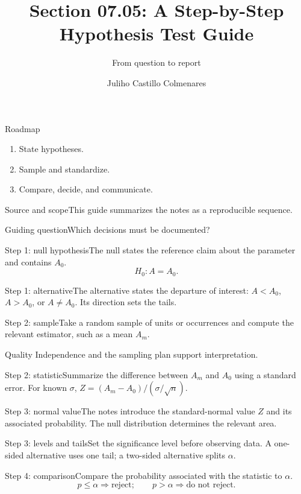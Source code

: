 \documentclass[10pt,aspectratio=169]{beamer}
\title[Hypothesis testing guide]{Section 07.05: A Step-by-Step Hypothesis Test Guide}\subtitle{From question to report}
\author[J. Castillo Colmenares]{Juliho Castillo Colmenares}\institute{Tecnológico de Monterrey}\date{}
\begin{document}
\begin{frame}[plain]\titlepage\end{frame}
\begin{frame}{Roadmap}\small\begin{enumerate}\item State hypotheses.\item Sample and standardize.\item Compare, decide, and communicate.\end{enumerate}\end{frame}
\begin{frame}{Source and scope}\small This guide summarizes the notes as a reproducible sequence.\begin{block}{Guiding question}Which decisions must be documented?\end{block}\end{frame}
\begin{frame}{Step 1: null hypothesis}\small The null states the reference claim about the parameter and contains $A_0$.\[H_0:A=A_0.\]\end{frame}
\begin{frame}{Step 1: alternative}\small The alternative states the departure of interest: $A<A_0$, $A>A_0$, or $A\neq A_0$. Its direction sets the tails.\end{frame}
\begin{frame}{Step 2: sample}\small Take a random sample of units or occurrences and compute the relevant estimator, such as a mean $A_m$.\begin{alertblock}{Quality} Independence and the sampling plan support interpretation.\end{alertblock}\end{frame}
\begin{frame}{Step 2: statistic}\small Summarize the difference between $A_m$ and $A_0$ using a standard error. For known $\sigma$, $Z=(A_m-A_0)/(\sigma/\sqrt n)$.\end{frame}
\begin{frame}{Step 3: normal value}\small The notes introduce the standard-normal value $Z$ and its associated probability. The null distribution determines the relevant area.\end{frame}
\begin{frame}{Step 3: levels and tails}\small Set the significance level before observing data. A one-sided alternative uses one tail; a two-sided alternative splits $\alpha$.\end{frame}
\begin{frame}{Step 4: comparison}\small Compare the probability associated with the statistic to $\alpha$.\[p\leq\alpha\Rightarrow\text{reject};\qquad p>\alpha\Rightarrow\text{do not reject}.\]\end{frame}
\end{document}
